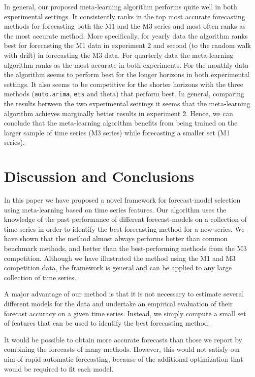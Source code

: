\documentclass[11pt,a4paper,]{article}
\theoremstyle{definition}
\theoremstyle{definition}
\theoremstyle{definition}
\theoremstyle{remark}
\begin{document}
In general, our proposed meta-learning algorithm performs quite well in
both experimental settings. It consistently ranks in the top most
accurate forecasting methods for forecasting both the M1 and the M3
series and most often ranks as the most accurate method. More
specifically, for yearly data the algorithm ranks best for forecasting
the M1 data in experiment 2 and second (to the random walk with drift)
in forecasting the M3 data. For quarterly data the meta-learning
algorithm ranks as the most accurate in both experiments. For the
monthly data the algorithm seems to perform best for the longer horizons
in both experimental settings. It also seems to be competitive for the
shorter horizons with the three methods (\texttt{auto.arima},
\texttt{ets} and theta) that perform best. In general, comparing the
results between the two experimental settings it seems that the
meta-learning algorithm achieves marginally better results in experiment
2. Hence, we can conclude that the meta-learning algorithm benefits from
being trained on the larger sample of time series (M3 series) while
forecasting a smaller set (M1 series).

\section{Discussion and Conclusions}\label{discussion}

In this paper we have proposed a novel framework for forecast-model
selection using meta-learning based on time series features. Our
algorithm uses the knowledge of the past performance of different
forecast-models on a collection of time series in order to identify the
best forecasting method for a new series. We have shown that the method
almost always performs better than common benchmark methods, and better
than the best-performing methods from the M3 competition. Although we
have illustrated the method using the M1 and M3 competition data, the
framework is general and can be applied to any large collection of time
series.

A major advantage of our method is that it is not necessary to estimate
several different models for the data and undertake an empirical
evaluation of their forecast accuracy on a given time series. Instead,
we simply compute a small set of features that can be used to identify
the best forecasting method.

It would be possible to obtain more accurate forecasts than those we
report by combining the forecasts of many methods. However, this would
not satisfy our aim of rapid automatic forecasting, because of the
additional optimization that would be required to fit each model.
\end{document}
